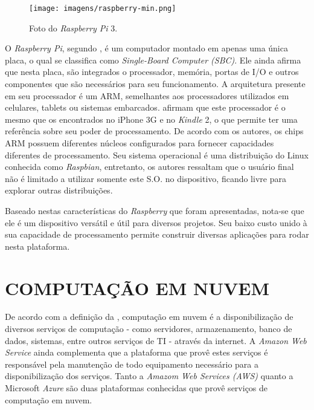 \begin{figure}[!ht]
\centering
\caption{Foto do \textit{Raspberry Pi} 3.} 
{\texttt{[image: imagens/raspberry-min.png]}}\\
 \label{Fig:raspberry_pi}
\end{figure}

O \textit{Raspberry Pi}, segundo , é um computador montado em apenas uma única placa, o qual se classifica como \textit{Single-Board Computer (SBC)}. Ele ainda afirma que nesta placa, são integrados o processador, memória, portas de I/O e outros componentes que são necessários para seu funcionamento. A arquitetura presente em seu processador é um ARM, semelhantes aos processadores utilizados em celulares, tablets ou sistemas embarcados.  afirmam que este processador é o mesmo que os encontrados no iPhone 3G e no \textit{Kindle} 2, o que permite ter uma referência sobre seu poder de processamento. De acordo com os autores, os chips ARM possuem diferentes núcleos configurados para fornecer capacidades diferentes de processamento. Seu sistema operacional é uma distribuição do Linux conhecida como \textit{Raspbian}, entretanto, os autores ressaltam que o usuário final não é limitado a utilizar somente este S.O. no dispositivo, ficando livre para explorar outras distribuições.

Baseado nestas características do \textit{Raspberry} que foram apresentadas, nota-se que ele é um dispositivo versátil e útil para diversos projetos. Seu baixo custo unido à sua capacidade de processamento permite construir diversas aplicações para rodar nesta plataforma.

\section{COMPUTAÇÃO EM NUVEM}
De acordo com a definição da , computação em nuvem é a disponibilização de diversos serviços de computação - como servidores, armazenamento, banco de dados, sistemas, entre outros serviços de TI - através da internet. A \textit{Amazon Web Service} \nocite{amazoncloudcomputing} ainda complementa que a plataforma que provê estes serviços é responsável pela manutenção de todo equipamento necessário para a disponibilização dos serviços. Tanto a \textit{Amazom Web Services (AWS)} quanto a Microsoft \textit{Azure} são duas plataformas conhecidas que provê serviços de computação em nuvem.

